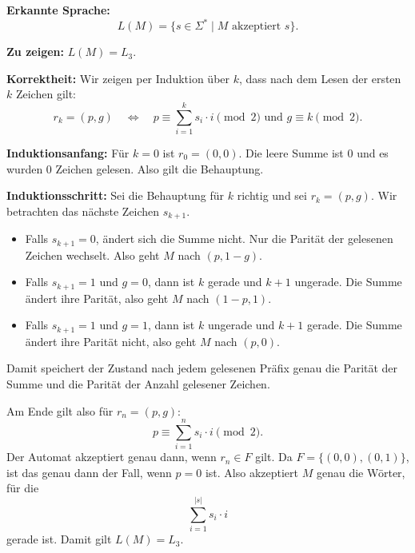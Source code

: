 \documentclass[a4paper,12pt]{article}
\begin{document}
\textbf{Erkannte Sprache:}
\[
L(M)=\{s \in \Sigma^* \mid M \text{ akzeptiert } s\}.
\]

\textbf{Zu zeigen:} $L(M)=L_3$.

\medskip
\textbf{Korrektheit:}
Wir zeigen per Induktion über $k$, dass nach dem Lesen der ersten $k$ Zeichen gilt:
\[
r_k=(p,g) \quad \Longleftrightarrow \quad
p \equiv \sum_{i=1}^{k} s_i \cdot i \pmod 2
\text{ und } g \equiv k \pmod 2.
\]

\textbf{Induktionsanfang:}
Für $k=0$ ist $r_0=(0,0)$.
Die leere Summe ist $0$ und es wurden $0$ Zeichen gelesen.
Also gilt die Behauptung.

\textbf{Induktionsschritt:}
Sei die Behauptung für $k$ richtig und sei $r_k=(p,g)$.
Wir betrachten das nächste Zeichen $s_{k+1}$.
\begin{itemize}
    \item Falls $s_{k+1}=0$, ändert sich die Summe nicht. Nur die Parität der gelesenen Zeichen wechselt. Also geht $M$ nach $(p,1-g)$.
    \item Falls $s_{k+1}=1$ und $g=0$, dann ist $k$ gerade und $k+1$ ungerade. Die Summe ändert ihre Parität, also geht $M$ nach $(1-p,1)$.
    \item Falls $s_{k+1}=1$ und $g=1$, dann ist $k$ ungerade und $k+1$ gerade. Die Summe ändert ihre Parität nicht, also geht $M$ nach $(p,0)$.
\end{itemize}
Damit speichert der Zustand nach jedem gelesenen Präfix genau die Parität der Summe und die Parität der Anzahl gelesener Zeichen.

Am Ende gilt also für $r_n=(p,g)$:
\[
p \equiv \sum_{i=1}^{n} s_i \cdot i \pmod 2.
\]
Der Automat akzeptiert genau dann, wenn $r_n \in F$ gilt.
Da $F=\{(0,0),(0,1)\}$, ist das genau dann der Fall, wenn $p=0$ ist.
Also akzeptiert $M$ genau die Wörter, für die
\[
\sum_{i=1}^{|s|} s_i \cdot i
\]
gerade ist.
Damit gilt $L(M)=L_3$.
\end{document}
